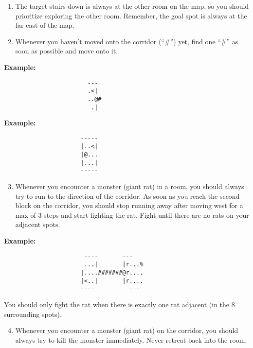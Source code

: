 \begin{MyGreenBox}
	\begin{enumerate}
		\item The target stairs down is always at the other room on the map, so you
			should prioritize exploring the other room. Remember, the goal spot is
			always at the far east of the map.

		\item Whenever you haven’t moved onto the corridor (“\#”) yet, find one “\#”
			as soon as possible and move onto it.
	\end{enumerate}

	\textbf{Example:}
	\begin{verbatim}
                        ---
                        .<|
                        ..@#
                         .|
\end{verbatim}

	\textbf{Example:}
	\begin{verbatim}
                      -----
                      |..<|
                      |@...
                      |...|
                      -----
\end{verbatim}

	\begin{enumerate}
		\setcounter{enumi}{2}

		\item Whenever you encounter a monster (giant rat) in a room, you should
			always try to run to the direction of the corridor. As soon as you reach the
			second block on the corridor, you should stop running away after moving
			west for a max of 3 steps and start fighting the rat. Fight until there are
			no rats on your adjacent spots.
	\end{enumerate}

	\textbf{Example:} \begin{verbatim}
                       ----       ---
                       ...|       |r...%
                      |....#######@r....
                      |<..|       |r....
                      ----          ---
\end{verbatim}

	You should only fight the rat when there is exactly one rat adjacent (in the 8
	surrounding spots).

	\begin{enumerate}
		\setcounter{enumi}{3}

		\item Whenever you encounter a monster (giant rat) on the corridor, you
			should always try to kill the monster immediately. Never retreat back into
			the room.
	\end{enumerate}


\end{MyGreenBox}
